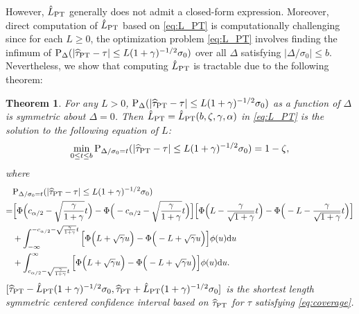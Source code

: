 \documentclass[11pt]{article}
\def\P{{\mathrm P}}
\def\d{{\mathrm d}}
\newcommand{\htau}{\widehat\tau}
\numberwithin{equation}{section}
\newtheorem{theorem}{Theorem}[section]
\theoremstyle{definition}
\begin{document}
However, $\hat{L}_{\rm PT}$ generally does not admit a closed-form expression. Moreover, direct computation of $\hat{L}_{\rm PT}$ based on \eqref{eq:L_PT} is computationally challenging since for each $L \ge 0$, the optimization problem \eqref{eq:L_PT} involves finding the infimum of $\P_\Delta(\lvert \htau_{\rm PT} - \tau \rvert \le L (1+\gamma)^{-1/2} \sigma_0)$ over all $\Delta$ satisfying $\lvert \Delta/\sigma_0 \rvert \le b$. Nevertheless, we show that computing $\hat{L}_{\rm PT}$ is tractable due to the following theorem:
\begin{theorem}\label{thm:L_PT}
    For any $L > 0$, $\P_\Delta(\lvert \htau_{\rm PT} - \tau \rvert \le L (1+\gamma)^{-1/2} \sigma_0)$ as a function of $\Delta$ is symmetric about $\Delta = 0$. Then $\hat{L}_{\rm PT} = \hat{L}_{\rm PT}(b, \zeta, \gamma, \alpha)$ in \eqref{eq:L_PT} is the solution to the following equation of $L$:
    \begin{align*}
      \min_{0 \le t \le b}\P_{\Delta/\sigma_0 = t}(\lvert \htau_{\rm PT} - \tau \rvert \le L (1+\gamma)^{-1/2} \sigma_0) = 1-\zeta,
    \end{align*}
    where
    \begin{align}\label{eq:P_PT}
      &\P_{\Delta/\sigma_0 = t}(\lvert \htau_{\rm PT} - \tau \rvert \le L (1+\gamma)^{-1/2} \sigma_0) \nonumber\\
      =& \Big[\Phi\Big(c_{\alpha/2} - \sqrt{\frac{\gamma}{1+\gamma}}t \Big) - \Phi\Big(-c_{\alpha/2} - \sqrt{\frac{\gamma}{1+\gamma}}t \Big)\Big]\Big[\Phi\Big(L - \frac{\gamma}{\sqrt{1+\gamma}}t \Big) - \Phi\Big(-L - \frac{\gamma}{\sqrt{1+\gamma}}t \Big)\Big]\nonumber\\
      &+ \int_{-\infty}^{-c_{\alpha/2} - \sqrt{\frac{\gamma}{1+\gamma}}t} \Big[\Phi\Big(L + \sqrt{\gamma} u \Big) - \Phi\Big(-L + \sqrt{\gamma} u\Big)\Big] \phi(u) \d u\nonumber\\
      &+ \int_{c_{\alpha/2} - \sqrt{\frac{\gamma}{1+\gamma}}t}^\infty \Big[\Phi\Big(L + \sqrt{\gamma} u\Big) - \Phi\Big(-L + \sqrt{\gamma} u\Big)\Big] \phi(u) \d u.
    \end{align}
    $[\htau_{\rm PT} - \hat{L}_{\rm PT} (1+\gamma)^{-1/2} \sigma_0, \htau_{\rm PT} + \hat{L}_{\rm PT} (1+\gamma)^{-1/2} \sigma_0]$ is the shortest length symmetric centered confidence interval based on $\htau_{\rm PT}$ for $\tau$ satisfying \eqref{eq:coverage}.
\end{theorem}
\end{document}
